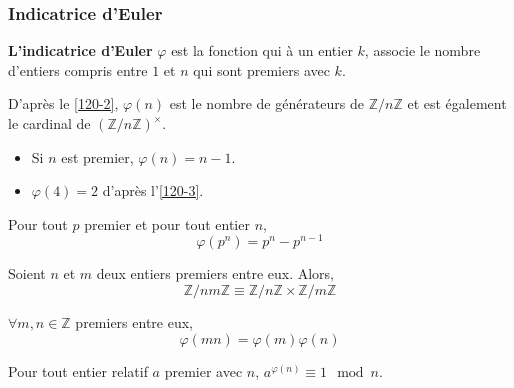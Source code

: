   \subsubsection{Indicatrice d'Euler}


  \begin{definition}
    \textbf{L'indicatrice d'Euler} $\varphi$ est la fonction qui à un entier $k$, associe le nombre d'entiers compris entre $1$ et $n$ qui sont premiers avec $k$.
  \end{definition}

  \begin{remark}
    D'après le \cref{120-2}, $\varphi(n)$ est le nombre de générateurs de $\mathbb{Z}/n\mathbb{Z}$ et est également le cardinal de $(\mathbb{Z}/n\mathbb{Z})^\times$.
  \end{remark}

  \begin{example}
    \begin{itemize}
      \item Si $n$ est premier, $\varphi(n) = n-1$.
      \item $\varphi(4) = 2$ d'après l'\cref{120-3}.
    \end{itemize}
  \end{example}


  \begin{proposition}
    Pour tout $p$ premier et pour tout entier $n$,
    \[ \varphi(p^n) = p^n - p^{n-1} \]
  \end{proposition}
  

  \begin{theorem}[Chinois]
    \label{120-4}
    Soient $n$ et $m$ deux entiers premiers entre eux. Alors,
    \[ \mathbb{Z}/nm\mathbb{Z} \equiv \mathbb{Z}/n\mathbb{Z} \times \mathbb{Z}/m\mathbb{Z} \]
  \end{theorem}

  \begin{corollary}
    $\forall m, n \in \mathbb{Z}$ premiers entre eux,
    \[ \varphi(mn) = \varphi(m)\varphi(n) \]
  \end{corollary}

  \begin{proposition}
    Pour tout entier relatif $a$ premier avec $n$, $a^{\varphi(n)} \equiv 1 \mod n$.
  \end{proposition}

